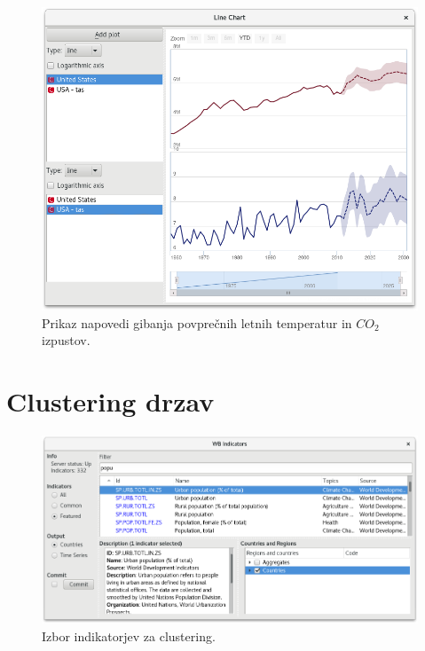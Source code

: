 \begin{figure}
\begin{center}
\includegraphics[width=12cm]{pic/var_forecast_graph.png}
\end{center}
\caption{Prikaz napovedi gibanja povprečnih letnih temperatur in $CO_2$ izpustov.}
\label{var_forecast_graph}
\end{figure} 




\section{Clustering drzav }



\begin{figure}
\begin{center}
\includegraphics[width=12cm]{pic/cluster_indicators.png}
\end{center}
\caption{Izbor indikatorjev za clustering.}
\label{cluster_indicators}
\end{figure} 

